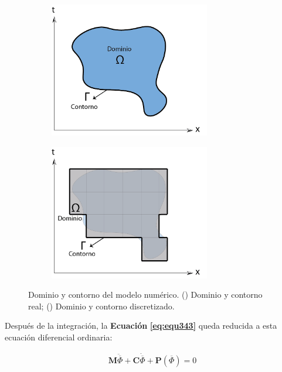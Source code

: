 \begin{figure}[!ht]
\centering
\begin{subfigure}[b]{.45\textwidth}
        \centering
        \includegraphics[width=7cm]{Imagenes/Dominio_Real.png}
        \caption{}
        \label{fig:fig32a}
\end{subfigure}
\hfill
\begin{subfigure}[b]{.45\textwidth}
        \centering
        \includegraphics[width=7cm]{Imagenes/Dominio_FEM.png}
        \caption{}
        \label{fig:fig32b}
\end{subfigure}
\captionsetup{format=plain}
\caption[Dominio y contorno del modelo numérico]{Dominio y contorno del modelo numérico. () Dominio y contorno real; () Dominio y contorno discretizado.} 
\label{fig:fig32}
\end{figure}

Después de la integración, la \textbf{Ecuación} \textbf{\ref{eq:equ343}} queda reducida a esta ecuación diferencial ordinaria:

\begin{ceqn} %
\begin{gather}\label{eq:equ351}
\mathbf{M}\ddot{\overline{\Phi}} + \mathbf{C}\dot{\overline{\Phi}} + \mathbf{P}(\overline{\Phi}) = 0
\end{gather}   
\end{ceqn}

